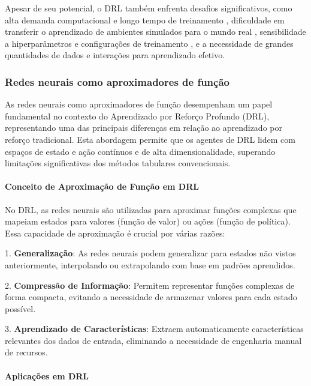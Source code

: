 Apesar de seu potencial, o DRL também enfrenta desafios significativos, como alta demanda computacional e longo tempo de treinamento \cite{https://www.semanticscholar.org/paper/8efe27f4a31ebb72e9b3047107a4fe940259aad9}, dificuldade em transferir o aprendizado de ambientes simulados para o mundo real \cite{https://www.semanticscholar.org/paper/fef82649815694167ef56929648a51f2eb0849e9}, sensibilidade a hiperparâmetros e configurações de treinamento \cite{https://www.semanticscholar.org/paper/3879ab51e5eea7ce06dc31edbb169afb76e0bd71}, e a necessidade de grandes quantidades de dados e interações para aprendizado efetivo.


\subsubsection{Redes neurais como aproximadores de função}
\label{subsubsec:redes_neurais}

As redes neurais como aproximadores de função desempenham um papel fundamental no contexto do Aprendizado por Reforço Profundo (DRL), representando uma das principais diferenças em relação ao aprendizado por reforço tradicional. Esta abordagem permite que os agentes de DRL lidem com espaços de estado e ação contínuos e de alta dimensionalidade, superando limitações significativas dos métodos tabulares convencionais.

\paragraph{Conceito de Aproximação de Função em DRL}

No DRL, as redes neurais são utilizadas para aproximar funções complexas que mapeiam estados para valores (função de valor) ou ações (função de política). Essa capacidade de aproximação é crucial por várias razões:

1. \textbf{Generalização}: As redes neurais podem generalizar para estados não vistos anteriormente, interpolando ou extrapolando com base em padrões aprendidos.

2. \textbf{Compressão de Informação}: Permitem representar funções complexas de forma compacta, evitando a necessidade de armazenar valores para cada estado possível.

3. \textbf{Aprendizado de Características}: Extraem automaticamente características relevantes dos dados de entrada, eliminando a necessidade de engenharia manual de recursos.

\paragraph{Aplicações em DRL}

